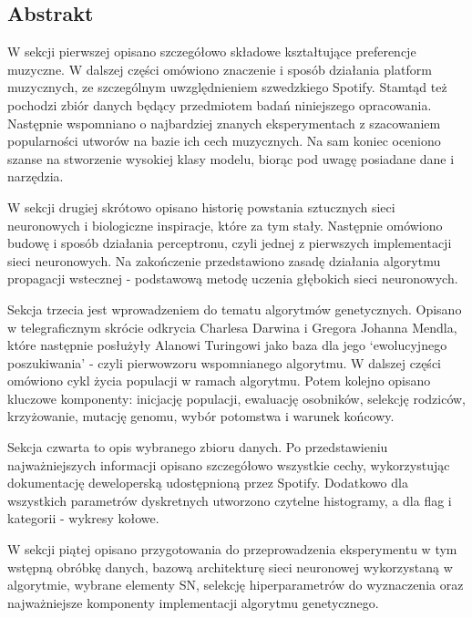 \documentclass[a4paper,12pt]{article}
\numberwithin{figure}{section}
\begin{document}
    \subsection{Abstrakt}

    W sekcji pierwszej opisano szczegółowo składowe kształtujące preferencje muzyczne. W dalszej części omówiono znaczenie i sposób działania platform muzycznych, ze szczególnym uwzględnieniem szwedzkiego Spotify. Stamtąd też pochodzi zbiór danych będący przedmiotem badań niniejszego opracowania. Następnie wspomniano o najbardziej znanych eksperymentach z szacowaniem popularności utworów na bazie ich cech muzycznych. Na sam koniec oceniono szanse na stworzenie wysokiej klasy modelu, biorąc pod uwagę posiadane dane i narzędzia.

    \bigskip

    W sekcji drugiej skrótowo opisano historię powstania sztucznych sieci neuronowych i biologiczne inspiracje, które za tym stały. Następnie omówiono budowę i sposób działania perceptronu, czyli jednej z pierwszych implementacji sieci neuronowych. Na zakończenie przedstawiono zasadę działania algorytmu propagacji wstecznej - podstawową metodę uczenia głębokich sieci neuronowych.

    \bigskip

    Sekcja trzecia jest wprowadzeniem do tematu algorytmów genetycznych. Opisano w telegraficznym skrócie odkrycia Charlesa Darwina i Gregora Johanna Mendla, które następnie posłużyły Alanowi Turingowi jako baza dla jego `ewolucyjnego poszukiwania' - czyli pierwowzoru wspomnianego algorytmu. W dalszej części omówiono cykl życia populacji w ramach algorytmu. Potem kolejno opisano kluczowe komponenty: inicjację populacji, ewaluację osobników, selekcję rodziców, krzyżowanie, mutację genomu, wybór potomstwa i warunek końcowy.

    \bigskip

    Sekcja czwarta to opis wybranego zbioru danych. Po przedstawieniu najważniejszych informacji opisano szczegółowo wszystkie cechy, wykorzystując dokumentację deweloperską udostępnioną przez Spotify. Dodatkowo dla wszystkich parametrów dyskretnych utworzono czytelne histogramy, a dla flag i kategorii - wykresy kołowe.

    \bigskip

    W sekcji piątej opisano przygotowania do przeprowadzenia eksperymentu w tym wstępną obróbkę danych, bazową architekturę sieci neuronowej wykorzystaną w algorytmie, wybrane elementy SN, selekcję hiperparametrów do wyznaczenia oraz najważniejsze komponenty implementacji algorytmu genetycznego.
\end{document}
